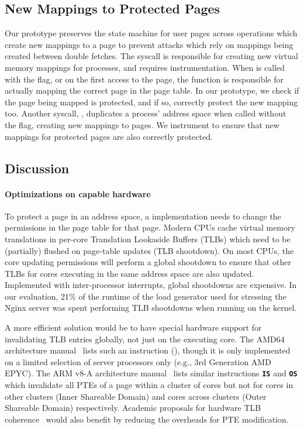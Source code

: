 \subsection{New Mappings to Protected Pages}

Our \midas prototype preserves the state machine for user pages
across operations which create new mappings to a page to prevent
attacks which rely on mappings being created between double fetches.
The  syscall is responsible for creating new virtual
memory mappings for processes, and requires instrumentation.
When  is called with the  flag, or
on the first access to the page, the  function
is responsible for actually mapping the correct page in the
page table.
In our prototype, we check if the page being mapped is protected,
and if so, correctly protect the new mapping too.
Another syscall, , duplicates a process' address space
when called without the  flag, creating new mappings
to pages.
We instrument  to ensure that new mappings for protected
pages are also correctly protected.


\subsection{Discussion}

\paragraph{Optimizations on capable hardware}
To protect a page in an address space, a \midas implementation
needs to change the permissions in the page table for that page.
Modern CPUs cache virtual memory translations in per-core
Translation Lookaside Buffers (TLBs) which need to be (partially)
flushed on page-table updates (TLB shootdown).
On most CPUs, the core updating permissions will perform a global
shootdown to ensure that other TLBs for cores executing in the
same address space are also updated.
Implemented with inter-processor interrupts, global shootdowns
are expensive.
In our evaluation, 21\% of the runtime of the load generator
 used for stressing the Nginx server was spent
performing TLB shootdowns when running on the \midas kernel.

A more efficient solution would be to have special hardware support
for invalidating TLB entries globally, not just on the executing
core.
The AMD64 architecture manual~\cite{amd64prog} lists such an instruction
(), though it is only implemented on a limited selection
of server processors only (e.g., 3rd Generation AMD EPYC).
The ARM v8-A architecture manual~\cite{armv8a} lists similar instructions
\texttt{\textbf{IS}} and \texttt{\textbf{OS}} which invalidate all PTEs
of a page within a cluster of cores but not for cores in other clusters
(Inner Shareable Domain) and cores across clusters (Outer
Shareable Domain) respectively.
Academic proposals for hardware TLB 
coherence~\cite{VillaviejaKVERMNCU11, YanVCB17, RomanescuLSB10} would also
benefit \midas by reducing the overheads for PTE modification.

